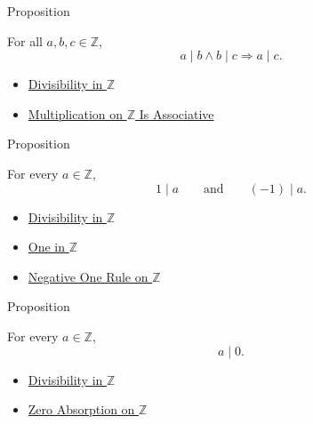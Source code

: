\begin{propositionbox}{Proposition}
\begin{proposition}
\label{prop:divisibility-transitive-on-z}
For all $a,b,c\in\mathbb{Z}$,
\[
a\mid b\land b\mid c \Longrightarrow a\mid c.
\]
\end{proposition}
\end{propositionbox}

\begin{dependencies}
\begin{itemize}
  \item \hyperref[def:divisibility-in-z]{Divisibility in $\mathbb{Z}$}
  \item \hyperref[thm:multiplication-on-z-associative]{Multiplication on $\mathbb{Z}$ Is Associative}
\end{itemize}
\end{dependencies}

\begin{propositionbox}{Proposition}
\begin{proposition}
\label{prop:units-divide-everything-on-z}
For every $a\in\mathbb{Z}$,
\[
1\mid a
\qquad\text{and}\qquad
(-1)\mid a.
\]
\end{proposition}
\end{propositionbox}

\begin{dependencies}
\begin{itemize}
  \item \hyperref[def:divisibility-in-z]{Divisibility in $\mathbb{Z}$}
  \item \hyperref[def:one-in-z]{One in $\mathbb{Z}$}
  \item \hyperref[cor:negative-one-rule-on-z]{Negative One Rule on $\mathbb{Z}$}
\end{itemize}
\end{dependencies}

\begin{propositionbox}{Proposition}
\begin{proposition}
\label{prop:everything-divides-zero-on-z}
For every $a\in\mathbb{Z}$,
\[
a\mid 0.
\]
\end{proposition}
\end{propositionbox}

\begin{dependencies}
\begin{itemize}
  \item \hyperref[def:divisibility-in-z]{Divisibility in $\mathbb{Z}$}
  \item \hyperref[cor:zero-absorption-on-z]{Zero Absorption on $\mathbb{Z}$}
\end{itemize}
\end{dependencies}

